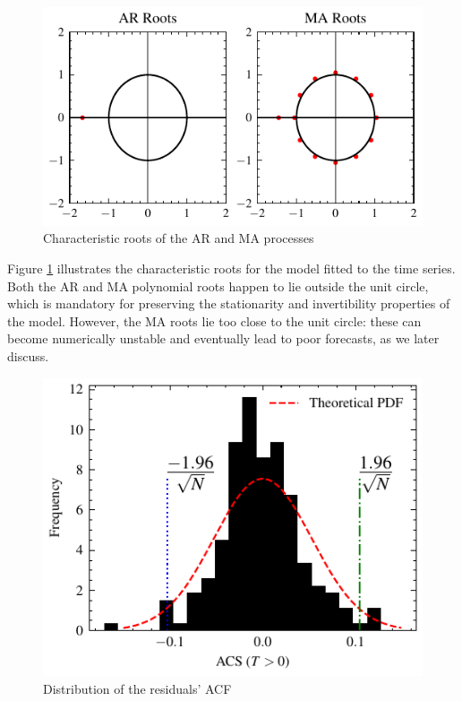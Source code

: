 \documentclass[conference]{IEEEtran}
\begin{document}
\begin{figure}[H]
    \centering
    \includegraphics{../figs/char_roots.pdf}
    \caption{Characteristic roots of the AR and MA processes}
    \label{fig:char_roots}
\end{figure}

Figure \ref{fig:char_roots} illustrates the characteristic roots for the model fitted to the time series. Both the AR and MA polynomial roots happen to lie outside the unit circle, which is mandatory for preserving the stationarity and invertibility properties of the model. However, the MA roots lie too close to the unit circle: these can become numerically unstable and eventually lead to poor forecasts, as we later discuss.

\begin{figure}[H]
    \centering
    \includegraphics{../figs/dist_acf.pdf}
    \caption{Distribution of the residuals' ACF}
    \label{fig:dist_acf}
\end{figure}
\end{document}

